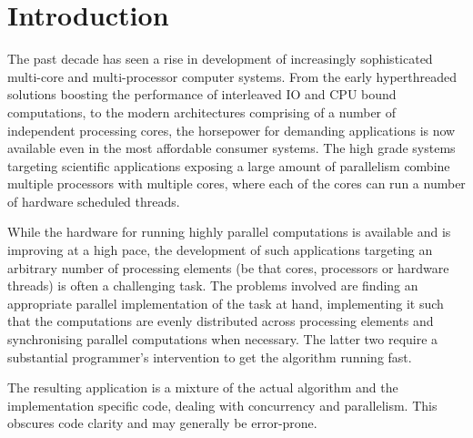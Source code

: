\documentclass[preamble.tex]{subfiles}
\begin{document}
\thispagestyle{empty}

\pagebreak{}


\tableofcontents


\pagebreak



\section{Introduction}

The past decade has seen a rise in development of increasingly sophisticated multi-core and multi-processor computer systems. From the early hyperthreaded solutions boosting the performance of interleaved IO and CPU bound computations, to the modern architectures comprising of a number of independent processing cores, the horsepower for demanding applications is now available even in the most affordable consumer systems. The high grade systems targeting scientific applications exposing a large amount of parallelism combine multiple processors with multiple cores, where each of the cores can run a number of hardware scheduled threads.

While the hardware for running highly parallel computations is available and is improving at a high pace, the development of such applications targeting an arbitrary number of processing elements (be that cores, processors or hardware threads) is often a challenging task. The problems involved are finding an appropriate parallel implementation of the task at hand, implementing it such that the computations are evenly distributed across processing elements and synchronising parallel computations when necessary. The latter two require a substantial programmer's intervention to get the algorithm running fast. %

The resulting application is a mixture of the actual algorithm and the implementation specific code, dealing with concurrency and parallelism. This obscures code clarity and may generally be error-prone.
\end{document}

